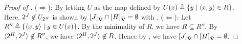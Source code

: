 \begin{proof}[Proof of ]
       ($\Rightarrow$):
       By letting $U$ as the map defined by $U(x) \defeq \set{y \mid \tuple{x, y} \in R}$.
       Here, $\tgt^{\graph[3]} \not\in U_{\tgt^{\graph[2]}}$ is shown by $\ljump{\graph[3]}_{\tilde{\vsig}} \cap \ljump{\graph[2]}_{\tilde{\vsig}} = \emptyset$ with .
       ($\Leftarrow$):
       Let $R'' \defeq \set{\tuple{x, y} \mid y \in U(x)}$.
       By the minimality of $R$, we have $R \subseteq R''$.
       By $\tuple{\tgt^{\graph[2]}, \tgt^{\graph[3]}} \not\in R''$, we have $\tuple{\tgt^{\graph[2]}, \tgt^{\graph[3]}} \not\in R$.
       Hence by , we have $\ljump{\graph[3]}_{\tilde{\vsig}} \cap \ljump{\graph[2]}_{\tilde{\vsig}} = \emptyset$.
\end{proof}


